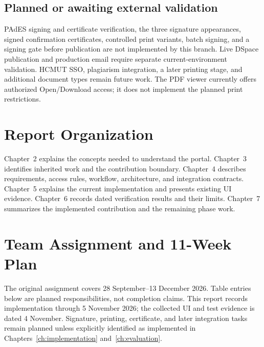 \documentclass[11pt,a4paper]{report}
\begin{document}
\subsection*{Planned or awaiting external validation}
PAdES signing and certificate verification, the three signature appearances, signed confirmation certificates, controlled print variants, batch signing, and a signing gate before publication are not implemented by this branch. Live DSpace publication and production email require separate current-environment validation. HCMUT SSO, plagiarism integration, a later printing stage, and additional document types remain future work. The PDF viewer currently offers authorized Open/Download access; it does not implement the planned print restrictions.

\section{Report Organization}
Chapter~2 explains the concepts needed to understand the portal. Chapter~3 identifies inherited work and the contribution boundary. Chapter~4 describes requirements, access rules, workflow, architecture, and integration contracts. Chapter~5 explains the current implementation and presents existing UI evidence. Chapter~6 records dated verification results and their limits. Chapter~7 summarizes the implemented contribution and the remaining phase work.

\clearpage\section{Team Assignment and 11-Week Plan}


The original assignment covers 28 September--13 December 2026. Table entries below are planned responsibilities, not completion claims. This report records implementation through 5 November 2026; the collected UI and test evidence is dated 4 November. Signature, printing, certificate, and later integration tasks remain planned unless explicitly identified as implemented in Chapters~\ref{ch:implementation} and~\ref{ch:evaluation}.
\end{document}
